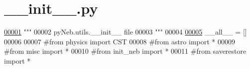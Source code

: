 \hypertarget{utils_2____init_____8py_source}{}\section{\+\_\+\+\_\+init\+\_\+\+\_\+.\+py}
\label{utils_2____init_____8py_source}

\begin{DoxyCode}
\hypertarget{utils_2____init_____8py_source_l00001}{}\hyperlink{namespacepyneb_1_1utils}{00001} \textcolor{stringliteral}{"""}
00002 \textcolor{stringliteral}{pyNeb.utils.\_\_init\_\_ file}
00003 \textcolor{stringliteral}{"""}
00004 
\hypertarget{utils_2____init_____8py_source_l00005}{}\hyperlink{namespacepyneb_1_1utils_a4cbc363c80d46a33717a18a0b4fcd281}{00005} \_\_all\_\_ = []
00006 
00007 \textcolor{comment}{#from physics import CST}
00008 \textcolor{comment}{#from astro import *}
00009 \textcolor{comment}{#from misc import *}
00010 \textcolor{comment}{#from init\_neb import *}
00011 \textcolor{comment}{#from saverestore import *}
\end{DoxyCode}
